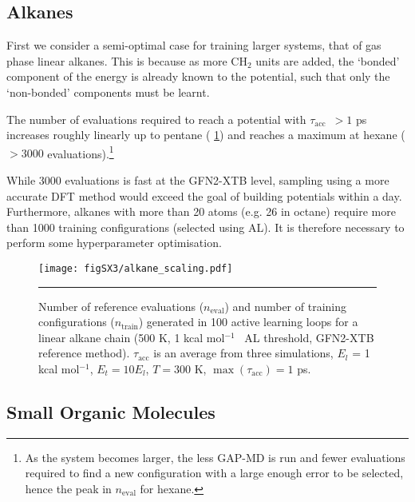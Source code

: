 \documentclass[11pt]{article}
\numberwithin{equation}{subsection}
\newcommand{\kcal}{kcal mol$^{-1}$}
\newcommand{\tacc}{$\tau_\text{acc}$}
\newcommand{\comment}[1]{}
\begin{document}
\newpage
\subsection{Alkanes}

First we consider a semi-optimal case for training larger systems, that of gas phase linear alkanes. This is because as more CH${}_2$ units are added, the `bonded' component of the energy is already known to the potential, such that only the `non-bonded' components must be learnt.


The number of evaluations required to reach a potential with \tacc~$>1$ ps increases roughly linearly up to pentane (\figurename{ \ref{fig::SX3}}) and reaches a maximum at hexane ($>3000$ evaluations).\footnote{As the system becomes larger, the less GAP-MD is run and fewer evaluations required to find a new configuration with a large enough error to be selected, hence the peak in $n_\text{eval}$ for hexane.} 


While 3000 evaluations is fast at the GFN2-XTB level, sampling using a more accurate DFT method would exceed the goal of building potentials within a day. Furthermore, alkanes with more than 20 atoms (e.g. 26 in octane) require more than 1000 training configurations (selected using AL). It is therefore necessary to perform some hyperparameter optimisation.


\begin{figure}[h!]
	\centering
	\vspace{0.4cm}
	\texttt{[image: figSX3/alkane\_scaling.pdf]}
	\vspace{0.1cm}
	\hrule
	\vspace{0.1cm}
	\caption{Number of reference evaluations ($n_\text{eval}$) and number of training configurations ($n_\text{train}$) generated in 100 active learning loops for a linear alkane chain (500 K, 1 \kcal~ AL threshold, GFN2-XTB reference method). $\tau_\text{acc}$ is an average from three simulations, $E_l$ = 1 \kcal, $E_t = 10E_l$, $T = 300$ K, $\max(\tau_\text{acc}) = 1$ ps.}
	\label{fig::SX3}
\end{figure}


\subsection{Small Organic Molecules}


\comment{
	TJW:  Maybe not worth the faff for the SI, but can we have the numbers not overlapping? It makes 23(?) and 29(?) hard to see on the n_train graph.
	TJW: It's interesting that benzene is so low, while cyclohexane is fairly high, even though they are both quite symmetric (other than the different conformations cyclohexane can take.
	TJW: Can you mention a brief summary of what the complexity metric is and can you also mention in the S3 caption you have scaled the values by this complexity metric?
}
\end{document}
